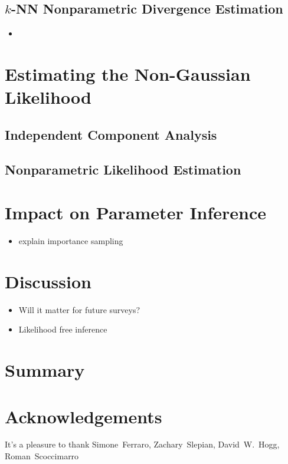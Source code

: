 \documentclass[12pt, letterpaper, preprint]{aastex}
\newcommand{\bitem}{\begin{itemize}}
\newcommand{\eitem}{\end{itemize}}
\begin{document}
\subsection{$k$-NN Nonparametric Divergence Estimation}
\bitem
    \item \cite{poczos2012, krishnamurthy2014}
\eitem
\section{Estimating the Non-Gaussian Likelihood}
\subsection{Independent Component Analysis} 

\subsection{Nonparametric Likelihood Estimation}

\section{Impact on Parameter Inference}
\bitem
    \item explain importance sampling 
\eitem

\section{Discussion}
\bitem
    \item Will it matter for future surveys? 
    \item Likelihood free inference
\eitem

\section{Summary}


\section*{Acknowledgements}
It's a pleasure to thank 
    Simone~Ferraro,
    Zachary~Slepian,
    David~W.~Hogg,
    Roman~Scoccimarro



\end{document}
